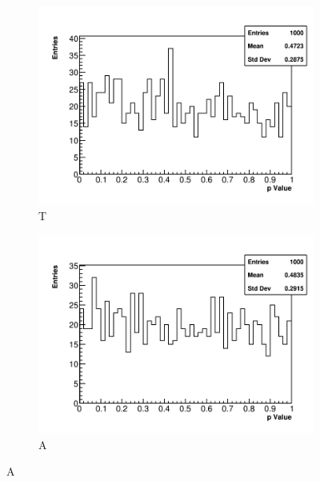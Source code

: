 \begin{figure}[]
\centering
    \begin{subfigure}[t]{0.45\textwidth}
        \centering
        \includegraphics[width=\textwidth]{PValues_TMethod}
        \caption{T}
    \end{subfigure}
    \hspace{1mm}
    \begin{subfigure}[t]{0.45\textwidth}
        \centering
        \includegraphics[width=\textwidth]{PValues_AMethod}
        \caption{A}
    \end{subfigure}%


\end{figure}
